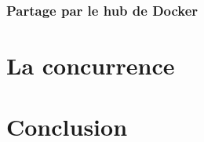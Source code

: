 \documentclass{beamer}
\begin{document}
    \subsubsection{Partage par le hub de Docker}
    \begin{frame}
    \end{frame}


    \section{La concurrence}
    \begin{frame}
    \end{frame}


    \section{Conclusion}
    \begin{frame}
    \end{frame}
\end{document}
